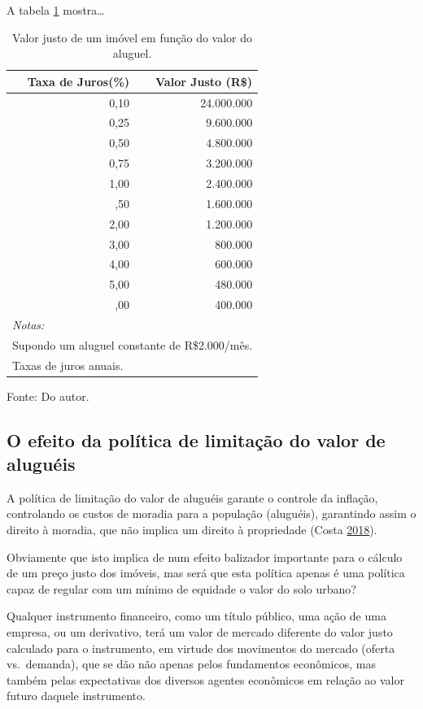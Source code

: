 \documentclass[
	12pt,				%
	oneside,			%
	a4paper,			%
	chapter=TITLE,		%
	section=TITLE,		%
	english,			%
	brazil				%
	]{abntex2}
\newcommand{\bcenter}{\begin{center}}
\newcommand{\ecenter}{\end{center}}
\begin{document}
A tabela \ref{tab:tabela-valor-justo} mostra\ldots{}
\begin{table}[H]

\caption{\label{tab:tabela-valor-justo}Valor justo de um imóvel em função do valor do aluguel.}
\centering
\begin{tabular}[t]{rr}
\toprule
Taxa de Juros(\%) & Valor Justo (R\$)\\
\midrule
0,10 & 24.000.000\\
0,25 & 9.600.000\\
0,50 & 4.800.000\\
0,75 & 3.200.000\\
1,00 & 2.400.000\\
\addlinespace
1,50 & 1.600.000\\
2,00 & 1.200.000\\
3,00 & 800.000\\
4,00 & 600.000\\
5,00 & 480.000\\
\addlinespace
6,00 & 400.000\\
\bottomrule
\multicolumn{2}{l}{\textit{Notas:}}\\
\multicolumn{2}{l}{Supondo um aluguel constante de R\$2.000/mês.}\\
\multicolumn{2}{l}{Taxas de juros anuais.}\\
\end{tabular}
\end{table}
\bcenter

Fonte: Do autor.
\ecenter

\hypertarget{o-efeito-da-poluxedtica-de-limitauxe7uxe3o-do-valor-de-aluguuxe9is}{%
\subsection{O efeito da política de limitação do valor de aluguéis}\label{o-efeito-da-poluxedtica-de-limitauxe7uxe3o-do-valor-de-aluguuxe9is}}

A política de limitação do valor de aluguéis garante o controle da inflação,
controlando os custos de moradia para a população (aluguéis), garantindo assim
o direito à moradia, que não implica um direito à propriedade (Costa \protect\hyperlink{ref-fnogueira}{2018}).

Obviamente que isto implica de num efeito balizador importante para o cálculo de
um preço justo dos imóveis, mas será que esta política apenas é uma política
capaz de regular com um mínimo de equidade o valor do solo urbano?

Qualquer instrumento financeiro, como um título público, uma ação de uma
empresa, ou um derivativo, terá um valor de mercado diferente do valor justo
calculado para o instrumento, em virtude dos movimentos do mercado (oferta
vs.~demanda), que se dão não apenas pelos fundamentos econômicos, mas também pelas
expectativas dos diversos agentes econômicos em relação ao valor futuro daquele
instrumento.
\end{document}
